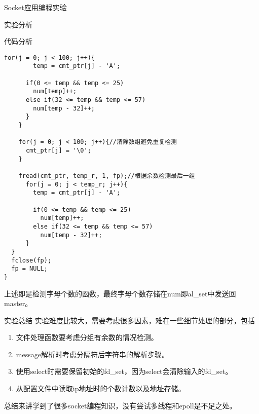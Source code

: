 \documentclass{article} %
\begin{document}
\begin{section}{Socket应用编程实验}
\begin{subsection}{实验分析}
\begin{subsubsection}{代码分析}
\begin{lstlisting}[language={[ANSI]C}]
	  for(j = 0; j < 100; j++){
		temp = cmt_ptr[j] - 'A';

	  if(0 <= temp && temp <= 25)
		num[temp]++;
	  else if(32 <= temp && temp <= 57)
		num[temp - 32]++;
	  }
	}

    for(j = 0; j < 100; j++){//清除数组避免重复检测
  	  cmt_ptr[j] = '\0';
  	}

    fread(cmt_ptr, temp_r, 1, fp);//根据余数检测最后一组
	  for(j = 0; j < temp_r; j++){
	    temp = cmt_ptr[j] - 'A';

	    if(0 <= temp && temp <= 25)
 		  num[temp]++;
	    else if(32 <= temp && temp <= 57)
		  num[temp - 32]++;
	  }
  }
  fclose(fp);
  fp = NULL;
}
				\end{lstlisting}
				上述即是检测字母个数的函数，最终字母个数存储在num即al\_set中发送回master。
			\end{subsubsection}
		\end{subsection}
		\begin{subsection}{实验总结}
			实验难度比较大，需要考虑很多因素，难在一些细节处理的部分，包括
			\begin{enumerate}[1)]
				\item 文件处理函数要考虑分组有余数的情况检测。
				\item message解析时考虑分隔符后字符串的解析步骤。
				\item 使用select时需要保留初始的fd\_set，因为select会清除输入的fd\_set。
				\item 从配置文件中读取ip地址时的个数计数以及地址存储。
			\end{enumerate}
			总结来讲学到了很多socket编程知识，没有尝试多线程和epoll是不足之处。
		\end{subsection}
	\end{section}
\end{document}
